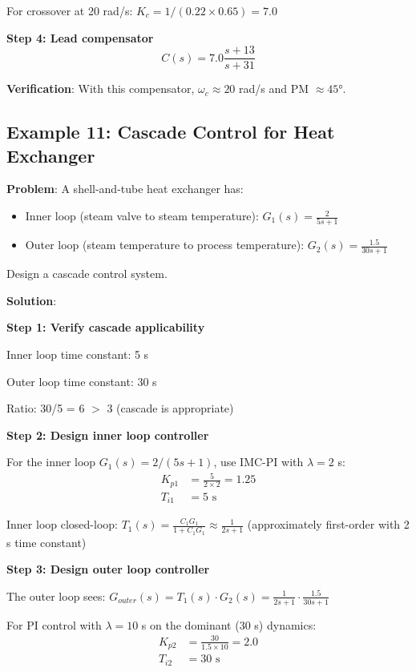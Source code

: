 For crossover at 20 rad/s: $K_c = 1/(0.22 \times 0.65) = 7.0$

\textbf{Step 4: Lead compensator}
\begin{equation}
C(s) = 7.0 \frac{s + 13}{s + 31}
\end{equation}

\textbf{Verification}: With this compensator, $\omega_c \approx 20$ rad/s and PM $\approx 45°$.

\subsection{Example 11: Cascade Control for Heat Exchanger}
\label{subsec:ex_cascade}

\textbf{Problem}: A shell-and-tube heat exchanger has:
\begin{itemize}
    \item Inner loop (steam valve to steam temperature): $G_1(s) = \frac{2}{5s+1}$
    \item Outer loop (steam temperature to process temperature): $G_2(s) = \frac{1.5}{30s+1}$
\end{itemize}

Design a cascade control system.

\textbf{Solution}:

\textbf{Step 1: Verify cascade applicability}

Inner loop time constant: 5 s

Outer loop time constant: 30 s

Ratio: 30/5 = 6 $>$ 3 (cascade is appropriate)

\textbf{Step 2: Design inner loop controller}

For the inner loop $G_1(s) = 2/(5s+1)$, use IMC-PI with $\lambda = 2$ s:
\begin{align}
K_{p1} &= \frac{5}{2 \times 2} = 1.25 \\
T_{i1} &= 5 \text{ s}
\end{align}

Inner loop closed-loop: $T_1(s) = \frac{C_1 G_1}{1 + C_1 G_1} \approx \frac{1}{2s + 1}$ (approximately first-order with 2 s time constant)

\textbf{Step 3: Design outer loop controller}

The outer loop sees: $G_{outer}(s) = T_1(s) \cdot G_2(s) = \frac{1}{2s+1} \cdot \frac{1.5}{30s+1}$

For PI control with $\lambda = 10$ s on the dominant (30 s) dynamics:
\begin{align}
K_{p2} &= \frac{30}{1.5 \times 10} = 2.0 \\
T_{i2} &= 30 \text{ s}
\end{align}

